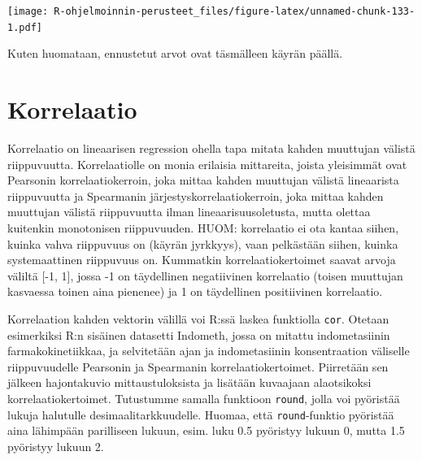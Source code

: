 \documentclass[
]{book}
\begin{document}
\texttt{[image: R-ohjelmoinnin-perusteet\_files/figure-latex/unnamed-chunk-133-1.pdf]}

Kuten huomataan, ennustetut arvot ovat täsmälleen käyrän päällä.

\hypertarget{korrelaatio}{%
\section{Korrelaatio}\label{korrelaatio}}

Korrelaatio on lineaarisen regression ohella tapa mitata kahden muuttujan välistä riippuvuutta. Korrelaatiolle on monia erilaisia mittareita, joista yleisimmät ovat Pearsonin korrelaatiokerroin, joka mittaa kahden muuttujan välistä lineaarista riippuvuutta ja Spearmanin järjestyskorrelaatiokerroin, joka mittaa kahden muuttujan välistä riippuvuutta ilman lineaarisuusoletusta, mutta olettaa kuitenkin monotonisen riippuvuuden. HUOM: korrelaatio ei ota kantaa siihen, kuinka vahva riippuvuus on (käyrän jyrkkyys), vaan pelkästään siihen, kuinka systemaattinen riippuvuus on. Kummatkin korrelaatiokertoimet saavat arvoja väliltä {[}-1, 1{]}, jossa -1 on täydellinen negatiivinen korrelaatio (toisen muuttujan kasvaessa toinen aina pienenee) ja 1 on täydellinen positiivinen korrelaatio.

Korrelaation kahden vektorin välillä voi R:ssä laskea funktiolla \texttt{cor}. Otetaan esimerkiksi R:n sisäinen datasetti Indometh, jossa on mitattu indometasiinin farmakokinetiikkaa, ja selvitetään ajan ja indometasiinin konsentraation väliselle riippuvuudelle Pearsonin ja Spearmanin korrelaatiokertoimet. Piirretään sen jälkeen hajontakuvio mittaustuloksista ja lisätään kuvaajaan alaotsikoksi korrelaatiokertoimet. Tutustumme samalla funktioon \texttt{round}, jolla voi pyöristää lukuja halutulle desimaalitarkkuudelle. Huomaa, että \texttt{round}-funktio pyöristää aina lähimpään parilliseen lukuun, esim. luku 0.5 pyöristyy lukuun 0, mutta 1.5 pyöristyy lukuun 2.
\end{document}
